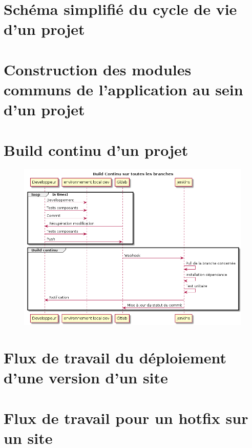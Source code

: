 \section{Schéma simplifié du cycle de vie d'un projet}

\clearpage
\section{Construction des modules communs de l'application au sein d'un projet \naq}

\clearpage
\section{Build continu d'un projet \naq}
\begin{figure}[ht]
	\centering
	\includegraphics[scale=0.6,angle=-90]{img/build-continu.png}
	\label{annexe:build-continu}
\end{figure}

\clearpage
\section{Flux de travail du déploiement d'une version d'un site \naq}

\clearpage
\section{Flux de travail pour un hotfix sur un site \naq}
